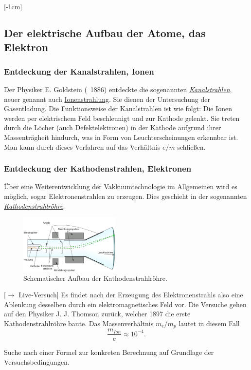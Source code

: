 \documentclass[]{subfiles}
\begin{document}
    [-1cm]
    \subsection{Der elektrische Aufbau der Atome, das Elektron}
        \subsubsection*{Entdeckung der Kanalstrahlen, Ionen}
            Der Physiker E. Goldstein (~1886) entdeckte die sogenannten \href{https://de.wikipedia.org/wiki/Kanalstrahlen}{\emph{Kanalstrahlen}}, neuer genannt auch \href{https://de.wikipedia.org/w/index.php?title=Ionenstrahlung&redirect=no}{Ionenstrahlung}. Sie dienen der Untersuchung der Gasentladung. Die Funktionsweise der Kanalstrahlen ist wie folgt:
            Die Ionen werden per elektrischem Feld beschleunigt und zur Kathode gelenkt. Sie treten durch die Löcher (auch Defektelektronen) in der Kathode aufgrund ihrer Massenträgheit hindurch, was in Form von Leuchterscheinungen erkennbar ist. 
            Man kann durch dieses Verfahren auf das Verhältnis $e/m$ schließen. 

        \subsubsection*{Entdeckung der Kathodenstrahlen, Elektronen}
            Über eine Weiterentwicklung der Vakkuumtechnologie im Allgemeinen wird es möglich, sogar Elektronenstrahlen zu erzeugen. Dies geschieht in der sogenannten \href{https://de.wikipedia.org/wiki/Kathodenstrahlröhre}{\textit{Kathodenstrahlröhre}}:
            \begin{figure}[H]
                \centering
                \includegraphics[width=5cm]{Bilddateien/Kathodenstrahlroehre.png}
                \caption{Schematischer Aufbau der Kathodenstrahlröhre.}
            \end{figure}
            [$\to$ Live-Versuch] Es findet nach der Erzeugung des Elektronenstrahls also eine Ablenkung desselben durch ein elektromagnetisches Feld vor. Die Versuche gehen auf den Physiker J. J. Thomson zurück, welcher 1897 die erste Kathodenstrahlröhre baute. 
            Das Massenverhältnis $m_e/m_p$ lautet in diesem Fall 
            \[\frac{m_{Ion}}{e}\approx 10^{-4}.\]
            \begin{Aufgabe}
                \nr{} Suche nach einer Formel zur konkreten Berechnung auf Grundlage der Versuchsbedingungen.
            \end{Aufgabe}
            
\end{document}
